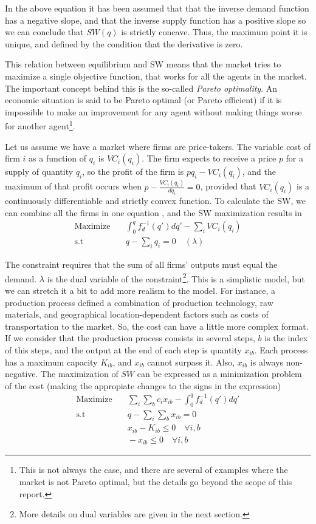 \documentclass[11pt, letterpaper]{article}
\begin{document}
In the above equation it has been assumed that that the inverse demand function has a negative slope, and that the inverse supply function has a positive slope so we can conclude that $SW(q)$ is strictly concave. Thus, the maximum point it is unique, and defined by the condition that the derivative is zero.

This relation between equilibrium and SW means that the market tries to maximize a single objective function, that works for all the agents in the market. The important concept behind this is the so-called \textit{Pareto optimality}. An economic situation is said to be Pareto optimal (or Pareto efficient) if it is impossible to make an improvement for any agent without making things worse for another agent\footnote{This is not always the case, and there are several of examples where the market is not Pareto optimal, but the details go beyond the scope of this report.}. 

Let us assume we have a market where firms are price-takers. The variable cost of firm $i$ as a function of $q_i$ is $VC_i(q_i)$. The firm expects to receive a price $p$ for a supply of quantity $q_i$, so the profit of the firm is $pq_i-VC_i(q_i)$, and the maximum of that profit occurs when  $p-\frac{VC_i(q_i)}{dq_i}=0$, provided that $VC_i(q_i)$ is a continuously
differentiable and strictly convex function. To calculate the SW, we can combine all the firms in one equation , and the SW maximization results in
\begin{align}
    \textrm{Maximize} & \quad \int_0^q f^{-1}_d(q')dq' - \sum_i VC_i(q_i)\\
    \textrm{s.t} & \quad q - \sum_i q_i = 0 \quad (\lambda)
\end{align}

The constraint requires that the sum of all firms’ outputs must equal the demand. $\lambda$ is the dual variable of the constraint\footnote{More details on dual variables are given in the next section.}. 
This is a simplistic model, but we can stretch it a bit to add more realism to the model. For instance, a production process defined a combination of  production technology, raw materials, and geographical location-dependent factors such as costs of transportation to the market. So, the cost can have a little more complex format.
If we consider that the production process consists in several steps, $b$ is the index of this steps, and the output at the end of each step is quantity $x_{ib}$. Each process has a maximum capacity $K_{ib}$, and $x_{ib}$ cannot surpass it. Also, $x_{ib}$ is always non-negative. The maximization of $SW$ can be expressed as a minimization problem of the cost (making the appropiate changes to the signs in the expression)
\begin{align}
     \textrm{Maximize} & \quad \sum_i \sum_b c_i x_{ib} - \int_0^q f^{-1}_d(q')dq' \\
    \textrm{s.t} & \quad q - \sum_i \sum_b x_{ib} = 0 \\
                 & \quad x_{ib}-K_{ib} \leq 0 \quad \forall i,b\\
                 & \quad -x_{ib} \leq 0 \quad \forall i,b
\end{align}
\end{document}
